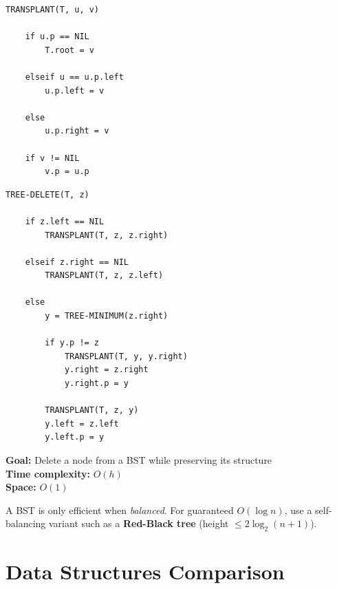 \documentclass[11pt,a4paper,openany]{book}
\begin{document}
\begin{lstlisting}
TRANSPLANT(T, u, v)

    if u.p == NIL
        T.root = v

    elseif u == u.p.left
        u.p.left = v

    else
        u.p.right = v

    if v != NIL
        v.p = u.p
\end{lstlisting}

\begin{lstlisting}
TREE-DELETE(T, z)

    if z.left == NIL
        TRANSPLANT(T, z, z.right)

    elseif z.right == NIL
        TRANSPLANT(T, z, z.left)

    else
        y = TREE-MINIMUM(z.right)

        if y.p != z
            TRANSPLANT(T, y, y.right)
            y.right = z.right
            y.right.p = y

        TRANSPLANT(T, z, y)
        y.left = z.left
        y.left.p = y
\end{lstlisting}

\textbf{Goal:} Delete a node from a BST while preserving its structure \\

\textbf{Time complexity:} $O(h)$ \\

\textbf{Space:} $O(1)$





\begin{warnbox}
A BST is only efficient when \emph{balanced}. For guaranteed $O(\log n)$, use a
self-balancing variant such as a \textbf{Red-Black tree} (height $\leq 2\log_2(n+1)$).
\end{warnbox}





\vspace{2cm}




\vspace{2cm}



\chapter{Data Structures Comparison}
\end{document}
